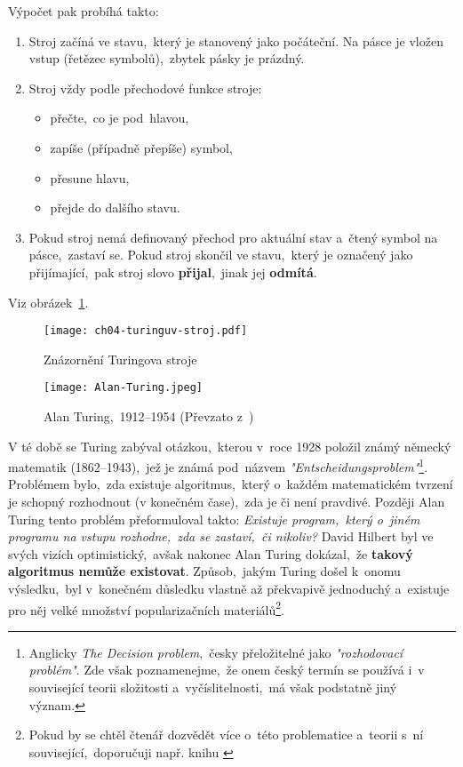 Výpočet pak probíhá takto:
\begin{enumerate}
    \item Stroj začíná ve stavu,~který je stanovený jako počáteční. Na pásce je vložen vstup (řetězec symbolů),~zbytek pásky je prázdný.
    \item Stroj vždy podle přechodové funkce stroje:
    \begin{itemize}
        \item přečte,~co je pod~hlavou,
        \item zapíše (případně přepíše) symbol,
        \item přesune hlavu,
        \item přejde do dalšího stavu.
    \end{itemize}
    \item Pokud stroj nemá definovaný přechod pro aktuální stav a~čtený symbol na pásce,~zastaví se. Pokud stroj skončil ve stavu,~který je označený jako přijímající,~pak stroj slovo \textbf{přijal},~jinak jej \textbf{odmítá}.
\end{enumerate}
Viz obrázek~\ref{fig:turinguv-stroj}.
\begin{figure}[h]
    \centering
    \texttt{[image: ch04-turinguv-stroj.pdf]}
    \caption{Znázornění Turingova stroje}
    \label{fig:turinguv-stroj}
\end{figure}
\begin{figure}[h]
    \centering
    \texttt{[image: Alan-Turing.jpeg]}
    \caption[Alan Turing,~1912--1954]{Alan Turing,~1912--1954 (Převzato z~\cite{OConnorTuring2025})}
    \label{fig:alan-turing}
\end{figure}
V té době se Turing zabýval otázkou,~kterou v~roce 1928 položil známý německý matematik  (1862--1943),~jež je známá pod~názvem \emph{"Entscheidungsproblem"}\footnote{Anglicky \emph{The Decision problem},~česky přeložitelné jako \emph{"rozhodovací problém"}. Zde však poznamenejme,~že onem český termín se používá i~v související teorii složitosti a~vyčíslitelnosti,~má však podstatně jiný význam.}. Problémem bylo,~zda existuje algoritmus,~který o~každém matematickém tvrzení je schopný rozhodnout (v konečném čase),~zda je či není pravdivé. Později Alan Turing tento problém přeformuloval takto: \emph{Existuje program,~který o~jiném programu na vstupu rozhodne,~zda se zastaví,~či nikoliv?} David Hilbert byl ve svých vizích optimistický,~avšak nakonec Alan Turing dokázal,~že \textbf{takový algoritmus nemůže existovat}. Způsob,~jakým Turing došel k~onomu výsledku,~byl v~konečném důsledku vlastně až překvapivě jednoduchý a~existuje pro něj velké množství popularizačních materiálů\footnote{Pokud by se chtěl čtenář dozvědět více o~této problematice a~teorii s~ní související,~doporučuji např. knihu \cite{Motwani2003}}.
